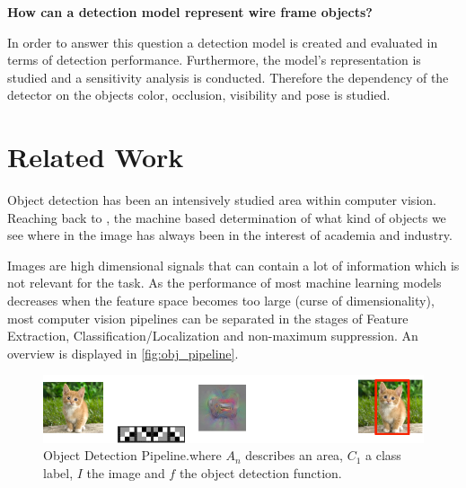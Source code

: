 	\begin{center}
		\textbf{ How can a detection model represent wire frame objects?}
	\end{center}
	
	In order to answer this question a detection model is created and evaluated in terms of detection performance. Furthermore, the model's representation is studied and a sensitivity analysis is conducted. Therefore the dependency of the detector on the objects color, occlusion, visibility and pose is studied.
	
	\section{Related Work}
	\label{sec:object_detection:related}
	Object detection has been an intensively studied area within computer vision. Reaching back to , the machine based determination of what kind of objects we see where in the image has always been in the interest of academia and industry.
	
	Images are high dimensional signals that can contain a lot of information which is not relevant for the task. As the performance of most machine learning models decreases when the feature space becomes too large (curse of dimensionality), most computer vision pipelines can be separated in the stages of Feature Extraction, Classification/Localization and non-maximum suppression. An overview is displayed in \autoref{fig:obj_pipeline}.
	
	\begin{figure}[hbtp]
	
	\centering
	\includegraphics[width=\linewidth]{fig/ObjectDetection}
	\caption{Object Detection Pipeline.where $A_n$ describes an area, $C_1$ a class label, $I$ the image and $f$ the object detection function.}
	\label{fig:obj_pipeline}
	
	\end{figure}

